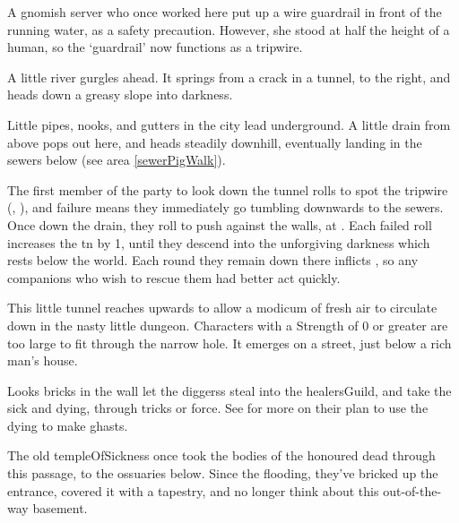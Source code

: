 \begin{multicols}{2}
\begin{exampletext}
  A gnomish \gls{server} who once worked here put up a wire guardrail in front of the running water, as a safety precaution.
  However, she stood at half the height of a human, so the `guardrail' now functions as a tripwire.
\end{exampletext}

\begin{boxtext}
  A little river gurgles ahead.
  It springs from a crack in a tunnel, to the right, and heads down a greasy slope into darkness.
\end{boxtext}

Little pipes, nooks, and gutters in the city lead underground.
A little drain from above pops out here, and heads steadily downhill, eventually landing in the sewers below (see area \vref{sewerPigWalk}).

The first member of the party to look down the tunnel rolls to spot the tripwire (, \tn[8]), and failure means they immediately go tumbling downwards to the sewers.
Once down the drain, they roll  to push against the walls, at \tn[9].
Each failed roll increases the \gls{tn} by 1, until they descend into the unforgiving darkness which rests below the world.
Each round they remain down there inflicts , so any companions who wish to rescue them had better act quickly.


This little tunnel reaches upwards to allow a modicum of fresh air to circulate down in the nasty little dungeon.
Characters with a Strength of 0 or greater are too large to fit through the narrow hole.
It emerges on a street, just below a rich man's house.


Looks bricks in the wall let the \glspl{diggers} steal into the \gls{healersGuild}, and take the sick and dying, through tricks or force.
See  for more on their plan to use the dying to make ghasts.

\begin{exampletext}
  The old \gls{templeOfSickness} once took the bodies of the honoured dead through this passage, to the ossuaries below.
  Since the flooding, they've bricked up the entrance, covered it with a tapestry, and no longer think about this out-of-the-way basement.

\end{exampletext}


\end{multicols}
